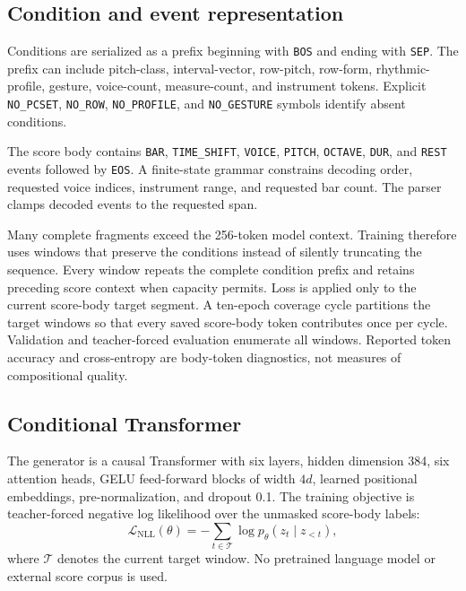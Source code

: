 \subsection{Condition and event representation}

Conditions are serialized as a prefix beginning with \texttt{BOS} and ending with \texttt{SEP}. The prefix can include pitch-class, interval-vector, row-pitch, row-form, rhythmic-profile, gesture, voice-count, measure-count, and instrument tokens. Explicit \texttt{NO\_PCSET}, \texttt{NO\_ROW}, \texttt{NO\_PROFILE}, and \texttt{NO\_GESTURE} symbols identify absent conditions.

The score body contains \texttt{BAR}, \texttt{TIME\_SHIFT}, \texttt{VOICE}, \texttt{PITCH}, \texttt{OCTAVE}, \texttt{DUR}, and \texttt{REST} events followed by \texttt{EOS}. A finite-state grammar constrains decoding order, requested voice indices, instrument range, and requested bar count. The parser clamps decoded events to the requested span.

Many complete fragments exceed the 256-token model context. Training therefore uses windows that preserve the conditions instead of silently truncating the sequence. Every window repeats the complete condition prefix and retains preceding score context when capacity permits. Loss is applied only to the current score-body target segment. A ten-epoch coverage cycle partitions the target windows so that every saved score-body token contributes once per cycle. Validation and teacher-forced evaluation enumerate all windows. Reported token accuracy and cross-entropy are body-token diagnostics, not measures of compositional quality.

\subsection{Conditional Transformer}

The generator is a causal Transformer \citep{vaswani2017attention} with six layers, hidden dimension 384, six attention heads, GELU feed-forward blocks of width $4d$, learned positional embeddings, pre-normalization, and dropout 0.1. The training objective is teacher-forced negative log likelihood over the unmasked score-body labels:
\begin{equation}
  \mathcal{L}_{\mathrm{NLL}}(\theta)
  =-\sum_{t\in\mathcal{T}}\log p_\theta(z_t\mid z_{<t}),
  \label{eq:nll}
\end{equation}
where $\mathcal{T}$ denotes the current target window. No pretrained language model or external score corpus is used.

